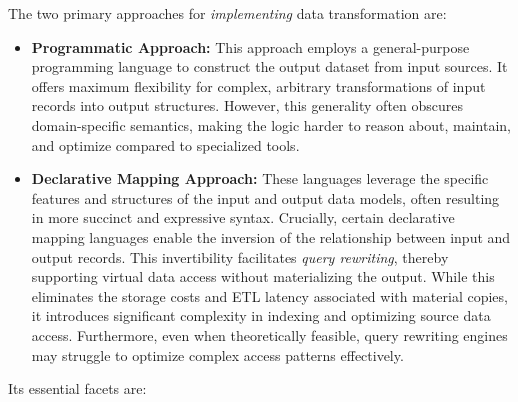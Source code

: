 The two primary approaches for \emph{implementing} data transformation are:
\begin{itemize}
  \item \textbf{Programmatic Approach:} This approach employs a general-purpose programming language to construct the output dataset from input sources.
  It offers maximum flexibility for complex, arbitrary transformations of input records into output structures.
  However, this generality often obscures domain-specific semantics, making the logic harder to reason about, maintain, and optimize compared to specialized tools.

  \item \textbf{Declarative Mapping Approach:} These languages leverage the specific features and structures of the input and output data models, often resulting in more succinct and expressive syntax.
  Crucially, certain declarative mapping languages enable the inversion of the relationship between input and output records.
  This invertibility facilitates \textit{query rewriting}, thereby supporting virtual data access without materializing the output.
  While this eliminates the storage costs and ETL latency associated with material copies, it introduces significant complexity in indexing and optimizing source data access.
  Furthermore, even when theoretically feasible, query rewriting engines may struggle to optimize complex access patterns effectively.
\end{itemize}


Its essential facets are:

